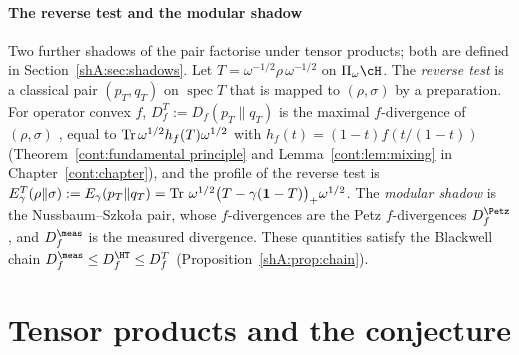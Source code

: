 \paragraph{The reverse test and the modular shadow} Two further shadows of the pair factorise under tensor products; both are defined in Section~\ref{shA:sec:shadows}. Let $T=\omega^{-1/2}\rho\,\omega^{-1/2}$ on $\Pi_\omega\cH$. The \emph{reverse test} is a classical pair $(p_T,q_T)$ on $\operatorname{spec}T$ that is mapped to $(\rho,\sigma)$ by a preparation. For operator convex $f$, $D^T_f:=D_f(p_T\|q_T)$ is the maximal $f$-divergence of $(\rho,\sigma)$ \cite{Matsumoto2018newf}, equal to $\operatorname{Tr}\omega^{1/2}h_f(T)\omega^{1/2}$ with $h_f(t)=(1-t)f(t/(1-t))$ (Theorem~\ref{cont:fundamental principle} and Lemma~\ref{cont:lem:mixing} in Chapter~\ref{cont:chapter}), and the profile of the reverse test is $E^T_\gamma(\rho\|\sigma):=E_\gamma(p_T\|q_T)=\operatorname{Tr}\,\omega^{1/2}\big(T-\gamma(\mathbf 1-T)\big)_+\omega^{1/2}$. The \emph{modular shadow} is the Nussbaum--Szko{\l}a pair, whose $f$-divergences are the Petz $f$-divergences $D^\Petz_f$ \cite{NussbaumSzkola2009,HiaiMosonyi2017}, and $D^\meas_f$ is the measured divergence. These quantities satisfy the Blackwell chain $D^\meas_f\le D^\HT_f\le D^T_f$ (Proposition~\ref{shA:prop:chain}).

\section{Tensor products and the conjecture}\label{shB:sec:tensor}

